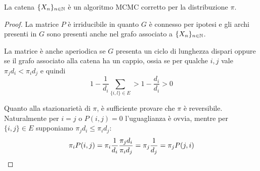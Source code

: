 \begin{thm}
	La catena $\{X_n\}_{n\in\mathbb N}$ è un algoritmo MCMC corretto per la distribuzione $\pi$.
\end{thm}
\begin{proof}
	La matrice $P$ è irriducibile in quanto $G$ è connesso per ipotesi e gli archi presenti in $G$ sono presenti anche nel grafo associato a $\{X_n\}_{n\in\mathbb N}$.

	La matrice è anche aperiodica se $G$ presenta un ciclo di lunghezza dispari oppure se il grafo associato alla catena ha un cappio, ossia se per qualche $i,j$ vale $\pi_j d_i<\pi_i d_j$ e quindi
	\begin{equation*}
		1 - \frac{1}{d_i} \sum_{\{i,l\}\in E} > 1 - \frac{d_i}{d_i} > 0
	\end{equation*}

	Quanto alla stazionarietà di $\pi$, è sufficiente provare che $\pi$ è reversibile. Naturalmente per $i=j$ o $P(i,j)=0$ l'uguaglianza è ovvia, mentre per $\{i,j\}\in E$ supponiamo $\pi_j d_i \le \pi_i d_j$:
	\begin{equation*}
		\pi_i P(i,j) = \pi_i \frac{1}{d_i} \frac{\pi_j d_i}{\pi_i d_j} = \pi_j \frac{1}{d_j} = \pi_j P(j,i) \qedhere
	\end{equation*}
\end{proof}
